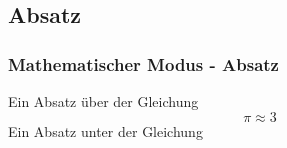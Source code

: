 \documentclass{beamer}
\begin{document}

\subsection{Absatz}
\begin{frame}[fragile]
\frametitle{Mathematischer Modus - Absatz}
  \begin{semiverbatim}
  \end{semiverbatim}
Ein Absatz über der Gleichung
\[\pi \approx 3\]
Ein Absatz unter der Gleichung
\end{frame}
\end{document}

